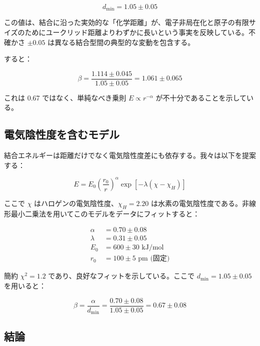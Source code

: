 \documentclass[11pt,a4paper]{article}
\begin{document}
	\begin{equation}
		d_{\text{min}} = 1.05 \pm 0.05
		\label{eq:dmin}
	\end{equation}
	
	この値は、結合に沿った実効的な「化学距離」が、電子非局在化と原子の有限サイズのためにユークリッド距離よりわずかに長いという事実を反映している。不確かさ $\pm 0.05$ は異なる結合型間の典型的な変動を包含する。
	
	すると：
	
	\begin{equation}
		\beta = \frac{1.114 \pm 0.045}{1.05 \pm 0.05} = 1.061 \pm 0.065
		\label{eq:beta-raw}
	\end{equation}
	
	これは 0.67 ではなく、単純なべき乗則 $E \propto r^{-\alpha}$ が不十分であることを示している。
	
	\subsection{電気陰性度を含むモデル}
	
	結合エネルギーは距離だけでなく電気陰性度差にも依存する。我々は以下を提案する：
	
	\begin{equation}
		E = E_0 \left(\frac{r_0}{r}\right)^{\alpha} \exp\left[-\lambda(\chi - \chi_H)\right]
		\label{eq:E-full}
	\end{equation}
	
	ここで $\chi$ はハロゲンの電気陰性度、$\chi_H = 2.20$ は水素の電気陰性度である。非線形最小二乗法を用いてこのモデルをデータにフィットすると：
	
	\begin{align}
		\alpha &= 0.70 \pm 0.08 \\
		\lambda &= 0.31 \pm 0.05 \\
		E_0 &= 600 \pm 30 \text{ kJ/mol} \\
		r_0 &= 100 \pm 5 \text{ pm (固定)}
	\end{align}
	
	簡約 $\chi^2 = 1.2$ であり、良好なフィットを示している。ここで $d_{\text{min}} = 1.05 \pm 0.05$ を用いると：
	
	\begin{equation}
		\beta = \frac{\alpha}{d_{\text{min}}} = \frac{0.70 \pm 0.08}{1.05 \pm 0.05} = 0.67 \pm 0.08
		\label{eq:beta-corrected}
	\end{equation}
	
	\subsection{結論}
	
\end{document}
